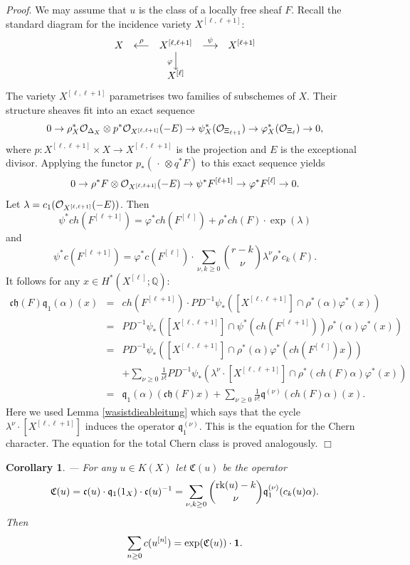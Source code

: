\documentclass[twoside,11pt]{article}
\newtheorem{corollary}[theorem]{Corollary}
\newcommand{\prf}{{\kursiv Proof}. }
\newcommand{\qed}{\hspace*{\fill}$\Box$\vspace{2ex}}
\newcommand{\beeq}[1]{\begin{eqnarray}\label{#1}}
\newcommand{\eneq}{\end{eqnarray}}
\newcommand{\kursiv}{\sl}
\newcommand{\ko}{{\cal O}}
\newcommand{\IQ}{{\mathbb Q}}
\newcommand{\gothc}{{\mathfrak c}}
\newcommand{\gothh}{{\mathfrak h}}
\newcommand{\gothq}{{\mathfrak q}}
\newcommand{\gothC}{{\mathfrak C}}
\newcommand{\tensor}{\otimes}
\newcommand{\qq}{\gothq}
\newcommand{\ch}{{\gothc\gothh}}
\newcommand{\vacuum}{{\bf 1}}
\renewcommand{\phi}{\varphi}
\newcommand{\rk}{{\rm rk}}
\newcommand{\ses}[3]{0\rightarrow#1\rightarrow#2
   \rightarrow#3\rightarrow0}
\begin{document}
\prf We may assume that $u$ is the class of a locally free sheaf $F$.
Recall the standard diagram for the incidence variety $X^{[\ell,\ell+1]}$:
$$
\begin{array}{ccccc}
X&\stackrel{\rho}\longleftarrow&X^{[\ell,\ell+1]}&\stackrel{\psi}{\longrightarrow}&X^{[\ell+1]}\\
&&{\scriptstyle \phi}\Big\downarrow\phantom{\scriptstyle \phi}\\
&&X^{[\ell]}
\end{array}
$$
The variety $X^{[\ell,\ell+1]}$ parametrises two families of subschemes of $X$. Their structure sheaves fit into an exact sequence
$$\ses{\rho_X^*\ko_{\Delta_X}\tensor p^*\ko_{X^{[\ell,\ell+1]}}(-E)}
{\psi_X^*(\ko_{\Xi_{\ell+1}})}{\phi_X^*(\ko_{\Xi_{\ell}})},$$
where $p:X^{[\ell,\ell+1]}\times X\to X^{[\ell,\ell+1]}$ is the projection
and $E$ is the exceptional divisor. 
Applying the functor $p_*(\,\cdot\,\tensor q^*F)$ to this exact sequence yields
\beeq{Geirssequence}
\ses{\rho^*F\tensor\ko_{X^{[\ell,\ell+1]}}(-E)}{\psi^*F^{[\ell+1]}}
{\phi^*F^{[\ell]}}.
\eneq
Let $\lambda=c_1(\ko_{X^{[\ell,\ell+1]}}(-E))$. Then
$$\psi^*ch(F^{[\ell+1]})=\phi^*ch(F^{[\ell]})+\rho^*ch(F)\cdot \exp(\lambda)$$
and
$$\psi^*c(F^{[\ell+1]})=\phi^*c(F^{[\ell]})\cdot \sum_{\nu,k\geq0}\binom{r-k}{\nu}\lambda^\nu \rho^*c_k(F).$$
It follows for any $x\in H^*(X^{[\ell]};\IQ)$:
\begin{eqnarray*}
\ch(F)\qq_1(\alpha)(x)&=&ch(F^{[\ell+1]})\cdot 
PD^{-1}\psi_*([X^{[\ell,\ell+1]}]\cap \rho^*(\alpha)\phi^*(x))\\
&=&PD^{-1}\psi_*([X^{[\ell,\ell+1]}]\cap\psi^*(ch(F^{[\ell+1]}))\rho^*(\alpha)
\phi^*(x))\\
&=&PD^{-1}\psi_*([X^{[\ell,\ell+1]}]\cap\rho^*(\alpha)\phi^*(ch(F^{[\ell]})x))\\
&&+\sum_{\nu\geq0}\frac{1}{\nu!}PD^{-1}\psi_*(\lambda^\nu
\cdot[X^{[\ell,\ell+1]}]\cap \rho^*(ch(F)\alpha)\phi^*(x))\\
&=&\qq_1(\alpha)(\ch(F)x)+\sum_{\nu\geq0}\frac{1}{\nu!}\qq^{(\nu)}
(ch(F)\alpha)(x).
\end{eqnarray*}
Here we used Lemma \ref{wasistdieableitung} which says that the cycle 
$\lambda^\nu\cdot[X^{[\ell,\ell+1]}]$ 
induces the operator $\qq_1^{(\nu)}$. This is the equation for the Chern 
character. The equation for the total Chern class is proved analogously.
\qed

\begin{corollary}\label{Chernclasses}--- For any $u\in K(X)$ let $\gothC(u)$ be the operator
$$\gothC(u)=\gothc(u)\cdot\qq_1(1_X)\cdot\gothc(u)^{-1}=
\sum_{\nu,k\geq0}\binom{\rk(u)-k}{\nu}\qq_1^{(\nu)}(c_k(u)\alpha).$$
Then
$$\sum_{n\geq0}c(u^{[n]})=\exp(\gothC(u))\cdot\vacuum.$$
\end{corollary}
\end{document}
